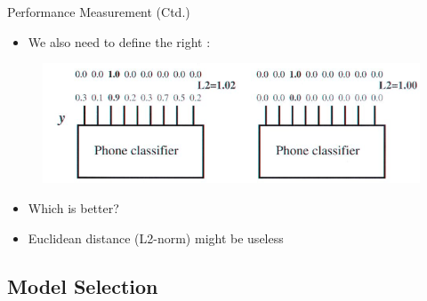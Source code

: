 \begin{frame}{Performance Measurement (Ctd.)}{}
	\begin{itemize}
		\item We also need to define the right :
	\end{itemize}
	\begin{figure}
		\centering
		\includegraphics[scale=0.5]{01_intro_ml/02_img/error_metric}
	\end{figure}
	\vspace*{-4mm}
	\begin{itemize}
		\item Which is better?
		\item Euclidean distance (L2-norm) might be useless
	\end{itemize}
\end{frame}


\subsection{Model Selection}

